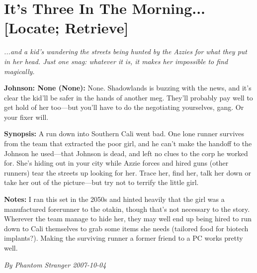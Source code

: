 \documentclass[letterpaper,twocolumn,10.5pt]{article}
\newenvironment{scenario}[6]
	{
		\section{#1 {\small[#2]}}
		\textit{#3}
		\def\TMPSCENARIO{#4 #5}
	}
	{\small\textit{By \TMPSCENARIO}}
\newcommand{\johnson}[2]{\textbf{Johnson: #1 (#2):}}
\newcommand{\synopsis}{\textbf{Synopsis: }}
\newcommand{\notes}{\textbf{Notes: }}
\begin{document}
\begin{scenario}{It's Three In The Morning...}
	{Locate; Retrieve}
	{ ...and a kid's wandering the streets being hunted by the Azzies for what they put in her head. Just one snag: whatever it is, it makes her impossible to find magically.}
	{Phantom Stranger}
	{2007-10-04}
	{https://forum.rpg.net/showthread.php?321504-Shadowrun-4th-101-Instant-Scenarios\&p=7895710#post7895710}

\johnson{None}{None}  None. Shadowlands is buzzing with the news, and it's clear the kid'll be safer in the hands of another meg. They'll probably pay well to get hold of her too---but you'll have to do the negotiating yourselves, gang. Or your fixer will.

\synopsis A run down into Southern Cali went bad. One lone runner survives from the team that extracted the poor girl, and he can't make the handoff to the Johnson he used---that Johnson is dead, and left no clues to the corp he worked for. She's hiding out in your city while Azzie forces and hired guns (other runners) tear the streets up looking for her. Trace her, find her, talk her down or take her out of the picture---but try not to terrify the little girl.

\notes 
I ran this set in the 2050s and hinted heavily that the girl was a manufactured forerunner to the otakin, though that's not necessary to the story. Wherever the team manage to hide her, they may well end up being hired to run down to Cali themselves to grab some items she needs (tailored food for biotech implants?). Making the surviving runner a former friend to a PC works pretty well.

\end{scenario}
\end{document}
